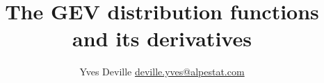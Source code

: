 \documentclass[10pt]{article}
\title{The GEV distribution functions and its derivatives}
\author{Yves Deville \href{mailto:deville.yves@alpestat.com}%
  {deville.yves@alpestat.com} }
\begin{document}
\maketitle{}
\tableofcontents


\end{document}
